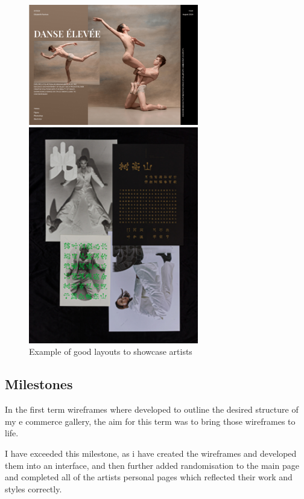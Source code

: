\documentclass[]{project_final}
\begin{document}
\begin{figure}[ht!]
    \centering
    \begin{minipage}[t]{0.4\textwidth}
        \includegraphics[width=20em]{artGalleryExample.png}
    \end{minipage}
    \hfill
    \begin{minipage}[t]{0.4\textwidth}
        \includegraphics[width=20em]{artGalleryExample2.png}
    \end{minipage}
    \caption{Example of good layouts to showcase artists}
    \label{fig:1}
\end{figure}
\subsection{Milestones}
In the first term wireframes where developed to outline the desired structure of my e commerce gallery, the aim for this term was to bring those wireframes to life.

I have exceeded this milestone, as i have created the wireframes and developed them into an interface, and then further added randomisation to the main page and completed all of the artists personal pages which reflected their work and styles correctly.
\end{document}
